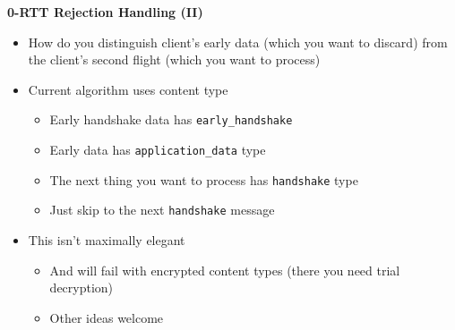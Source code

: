 \documentclass[helvetica]{seminar}
\newcommand{\heading}[1]{%
  \begin{center} 
    \large\bf 
    #1 
  \end{center} 
  \vspace{.4 in}}
\begin{document}
\begin{slide}
\heading{0-RTT Rejection Handling (II)}

\vspace{-2ex}
\begin{itemize}
\item How do you distinguish client's early data (which you want to discard) from the client's second flight (which you want to process)
\item Current algorithm uses content type
  \begin{itemize}
  \item Early handshake data has \verb^early_handshake^
  \item Early data has \verb^application_data^ type
  \item The next thing you want to process has \verb^handshake^ type
  \item Just skip to the next \verb^handshake^ message
  \end{itemize}
\item This isn't maximally elegant
  \begin{itemize}
  \item And will fail with encrypted content types (there you need trial decryption)
  \item Other ideas welcome
  \end{itemize}
\end{itemize}
\end{slide}
\end{document}
